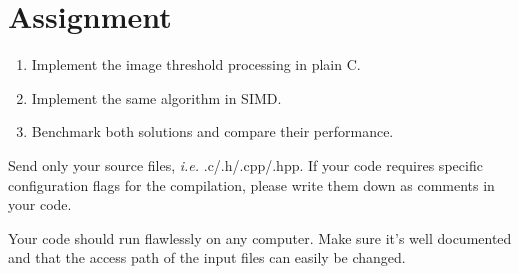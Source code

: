 \documentclass[10pt,a4paper]{article}
\theoremstyle{definition}%
\begin{document}
\section*{Assignment}
\begin{enumerate}
	\item Implement the image threshold processing in plain C.
	\item Implement the same algorithm in SIMD.
	\item Benchmark both solutions and compare their performance.
\end{enumerate}

Send only your source files, \textit{i.e.} .c/.h/.cpp/.hpp.
If your code requires specific configuration flags for the compilation, please write them down as comments in your code.

Your code should run flawlessly on any computer.
Make sure it's well documented and that the access path of the input files can easily be changed.
\end{document}
